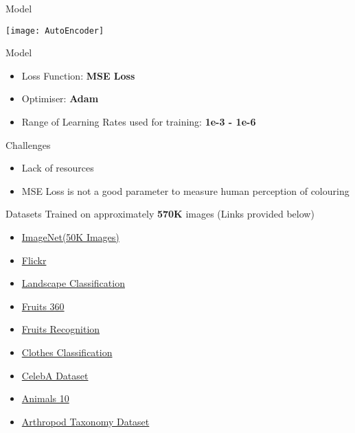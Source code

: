\documentclass[12pt]{beamer}
\begin{document}
\begin{frame}{Model}
	\begin{center}
		\texttt{[image: AutoEncoder]}
	\end{center}
\end{frame}

\begin{frame}{Model}
	\begin{itemize}
		\item Loss Function: \textbf{MSE Loss}
		\item Optimiser: \textbf{Adam}
		\item Range of Learning Rates used for training: \textbf{1e-3 - 1e-6}
	\end{itemize}
\end{frame}

\begin{frame}{Challenges}
	\begin{itemize}
		\item Lack of resources
			\pause
		\item MSE Loss is not a good parameter to measure human perception of colouring
	\end{itemize}
\end{frame}

\begin{frame}{Datasets}
	Trained on approximately \textbf{570K} images (Links provided below)
	\begin{itemize}
		\item \href{https://www.kaggle.com/lijiyu/imagenet}{ImageNet(50K Images)}\\
		\item \href{https://www.kaggle.com/hsankesara/flickr-image-dataset}{Flickr}\\
		\item \href{https://www.kaggle.com/huseynguliyev/landscape-classification}{Landscape Classification}\\
		\item \href{https://www.kaggle.com/moltean/fruits}{Fruits 360}\\
		\item \href{https://www.kaggle.com/chrisfilo/fruit-recognition}{Fruits Recognition}\\
		\item \href{https://www.kaggle.com/salil007/caavo}{Clothes Classification}\\
		\item \href{https://www.kaggle.com/jessicali9530/celeba-dataset}{CelebA Dataset}\\
		\item \href{https://www.kaggle.com/alessiocorrado99/animals10}{Animals 10}\\
		\item \href{https://www.kaggle.com/mistag/arthropod-taxonomy-orders-object-detection-dataset}{Arthropod Taxonomy Dataset}\\
	\end{itemize}
\end{frame}
\end{document}
